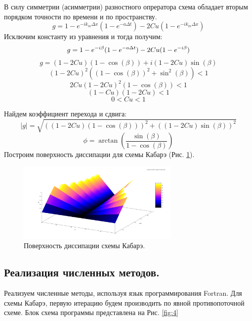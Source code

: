 В силу симметрии (асимметрии) разностного опрератора схема обладает вторым порядком точности по времени и по пространству.
\begin{equation}
    g=1-e^{-ik_m\Delta x}(1-e^{-a\Delta t})-2Cu(1-e^{-ik_m\Delta x})
\end{equation}
Исключим константу из уравнения и тогда получим:
\begin{equation}
    g=1-e^{-i\beta}(1-e^{-a\Delta t})-2Cu(1-e^{-i\beta})\\
\end{equation}
$$g=(1-2Cu)(1-\cos(\beta))+i(1-2Cu)\sin(\beta)$$
\begin{equation}
    (1-2Cu)^2((1-\cos(\beta))^2+\sin^2(\beta))<1
\end{equation}
\begin{equation}
    2Cu(1-2Cu)^2(1-\cos(\beta))<1
\end{equation}
\begin{equation}
    (1-Cu)(1-2Cu)<1
\end{equation}
\begin{equation}
    0<Cu<1
\end{equation}

Найдем коэффициент перехода и сдвига:
$$|g|=\sqrt{((1-2Cu)(1-\cos(\beta)))^2+((1-2Cu)\sin(\beta))^2}$$
$$\phi=\arctan(\frac{\sin(\beta)}{1-\cos(\beta)})$$
Построим поверхность диссипации для схемы Кабарэ (Рис. \ref{fig:13}). 

\begin{figure}[H]
    \centering
    \includegraphics[width=0.7\textwidth]{images/15.png}
    \caption{Поверхность диссипации схемы Кабарэ.}
    \label{fig:13}
\end{figure}

\subsection{Реализация численных методов.}
Реализуем численные методы, используя язык программирования Fortran. Для схемы Кабарэ, первую итерацию будем производить по явной противопоточной схеме. Блок схема программы представлена на Рис. \ref{fig:4}
